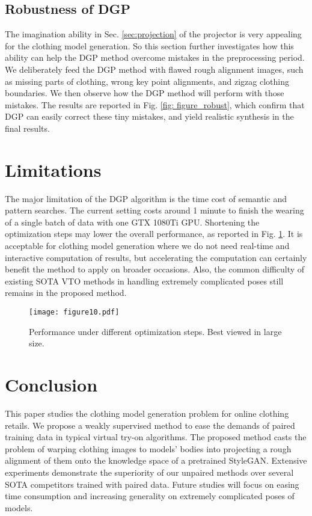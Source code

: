 \documentclass[10pt,twocolumn,letterpaper]{article}
\begin{document}
\subsection{Robustness of DGP}\label{sec:robust}
 The imagination ability in Sec. \ref{sec:projection} of the projector is very appealing for the clothing model generation. So this section further investigates how this ability can help the DGP method overcome mistakes in the preprocessing period. We deliberately feed the DGP method with flawed rough alignment images, such as missing parts of clothing, wrong key point alignments, and zigzag clothing boundaries. We then observe how the DGP method will perform with those mistakes. The results are reported in Fig. \ref{fig: figure_robust}, which confirm that DGP can easily correct these tiny mistakes, and yield realistic synthesis in the final results.


\section{Limitations}
The major limitation of the DGP algorithm is the time cost of semantic and pattern searches. The current setting costs around 1 minute to finish the wearing of a single batch of data with one GTX 1080Ti GPU. Shortening the optimization steps may lower the overall performance, as reported in Fig. \ref{fig: figure_inversion_time}. It is acceptable for clothing model generation where we do not need real-time and interactive computation of results, but accelerating the computation can certainly benefit the method to apply on broader occasions. Also, the common difficulty of existing SOTA VTO methods in handling extremely complicated poses still remains in the proposed method. \begin{figure}[h]\centering
  \texttt{[image: figure10.pdf]}\caption{Performance under different optimization steps. Best viewed in large size.}\label{fig: figure_inversion_time}\end{figure}



\section{Conclusion}
This paper studies the clothing model generation problem for online clothing retails. We propose a weakly supervised method to ease the demands of paired training data in typical virtual try-on algorithms. The proposed method casts the problem of warping clothing images to models' bodies into projecting a rough alignment of them onto the knowledge space of a pretrained StyleGAN. Extensive experiments demonstrate the superiority of our unpaired methods over several SOTA competitors trained with paired data. Future studies will focus on easing time consumption and increasing generality on extremely complicated poses of models.
\end{document}
